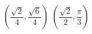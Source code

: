 { $\left(\dfrac{\sqrt{2}}{4}, \dfrac{\sqrt{6}}{4}\right)$}
{ $\left(\dfrac{\sqrt{2}}{2}, \dfrac{\pi}{3}\right)$}
